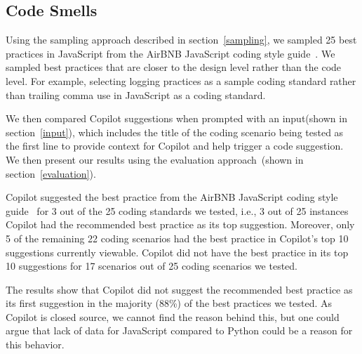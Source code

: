 \subsection{Code Smells}
\label{smells:results}
Using the sampling approach described in section~\ref{sampling}, we sampled 25 best practices in JavaScript from the AirBNB JavaScript coding style guide~\cite{airbnb_code}. 
We sampled best practices that are closer to the design level rather than the code level. For example, selecting logging practices as a sample coding standard rather than trailing comma use in JavaScript as a coding standard.

We then compared Copilot suggestions when prompted with an input(shown in section~\ref{input}), which includes the title of the coding scenario being tested as the first line to provide context for Copilot and help trigger a code suggestion. 
We then present our results using the evaluation approach~(shown in section~\ref{evaluation}).

Copilot suggested the best practice from the AirBNB JavaScript coding style guide~\cite{airbnb_code} for 3 out of the 25 coding standards we tested, i.e., 3 out of 25 instances Copilot had the recommended best practice as its top suggestion.
Moreover, only 5 of the remaining 22 coding scenarios had the best practice in Copilot's top 10 suggestions currently viewable. 
Copilot did not have the best practice in its top 10 suggestions for 17 scenarios out of 25 coding scenarios we tested.

The results show that Copilot did not suggest the recommended best practice as its first suggestion in the majority (88\%) of the best practices we tested.
As Copilot is closed source, we cannot find the reason behind this, but one could argue that lack of data for JavaScript compared to Python could be a reason for this behavior. 



